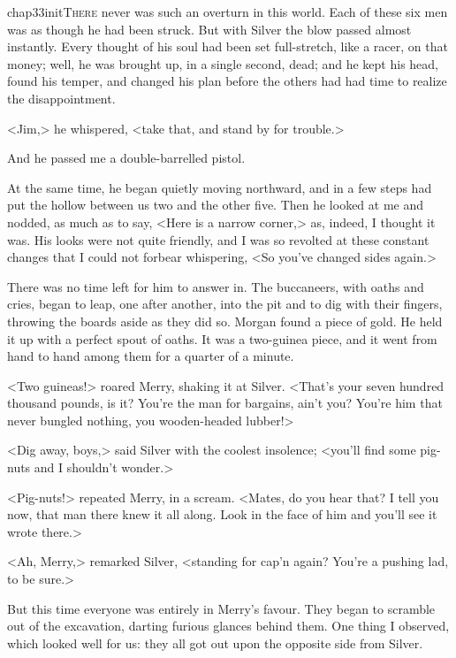 
\lettrine{chap33initT}{here} never was such an overturn in this world. Each of these six men was as though he had been struck. But with Silver the blow passed almost instantly. Every thought of his soul had been set full-stretch, like a racer, on that money; well, he was brought up, in a single second, dead; and he kept his head, found his temper, and changed his plan before the others had had time to realize the disappointment.

<Jim,> he whispered, <take that, and stand by for trouble.>

And he passed me a double-barrelled pistol.

At the same time, he began quietly moving northward, and in a few steps had put the hollow between us two and the other five. Then he looked at me and nodded, as much as to say, <Here is a narrow corner,> as, indeed, I thought it was. His looks were not quite friendly, and I was so revolted at these constant changes that I could not forbear whispering, <So you've changed sides again.>

There was no time left for him to answer in. The buccaneers, with oaths and cries, began to leap, one after another, into the pit and to dig with their fingers, throwing the boards aside as they did so. Morgan found a piece of gold. He held it up with a perfect spout of oaths. It was a two-guinea piece, and it went from hand to hand among them for a quarter of a minute.

<Two guineas!> roared Merry, shaking it at Silver. <That's your seven hundred thousand pounds, is it? You're the man for bargains, ain't you? You're him that never bungled nothing, you wooden-headed lubber!>

<Dig away, boys,> said Silver with the coolest insolence; <you'll find some pig-nuts and I shouldn't wonder.>

<Pig-nuts!> repeated Merry, in a scream. <Mates, do you hear that? I tell you now, that man there knew it all along. Look in the face of him and you'll see it wrote there.>

<Ah, Merry,> remarked Silver, <standing for cap'n again? You're a pushing lad, to be sure.>

But this time everyone was entirely in Merry's favour. They began to scramble out of the excavation, darting furious glances behind them. One thing I observed, which looked well for us: they all got out upon the opposite side from Silver.

